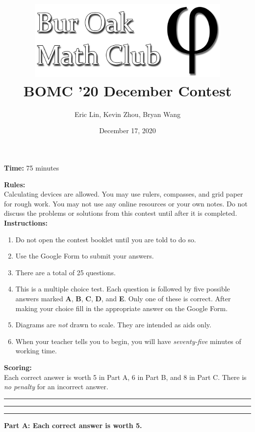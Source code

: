 \documentclass[12pt]{article}
\author{Eric Lin, Kevin Zhou, Bryan Wang}
\title{\includegraphics[width=10cm]{Bur Oak Math Club Banner Bold.png}\\\vspace{0.25in} BOMC '20 December Contest}
\date{December 17, 2020}
\begin{document}
\maketitle

\textbf{Time:} 75 minutes \bigskip

\textbf{Rules:} \medskip
\\Calculating devices are allowed. You may use rulers, compasses, and grid paper for rough work. You may not use any online resources or your own notes. Do not discuss the problems or solutions from this contest until after it is completed.\\

\textbf{Instructions:}
\begin{enumerate}
    \item Do not open the contest booklet until you are told to do so.
    \item Use the Google Form to submit your answers.
    \item There are a total of 25 questions.
    \item This is a multiple choice test. Each question is followed by five possible answers marked \textbf{A}, \textbf{B}, \textbf{C}, \textbf{D}, and \textbf{E}. Only one of these is correct. After making your choice fill in the appropriate answer on the Google Form.
    \item Diagrams are \textit{not} drawn to scale. They are intended as aids only.
    \item When your teacher tells you to begin, you will have \textit{seventy-five} minutes of working time.
\end{enumerate}

\textbf{Scoring:}\medskip
\\Each correct answer is worth 5 in Part A, 6 in Part B, and 8 in Part C. There is \textit{no penalty} for an incorrect answer.

\par\noindent\rule{\textwidth}{1pt}
\par\noindent\rule{\textwidth}{1pt}

\newpage
\par\noindent\rule{\textwidth}{1pt}
\textbf{Part A: Each correct answer is worth 5.}
\end{document}
